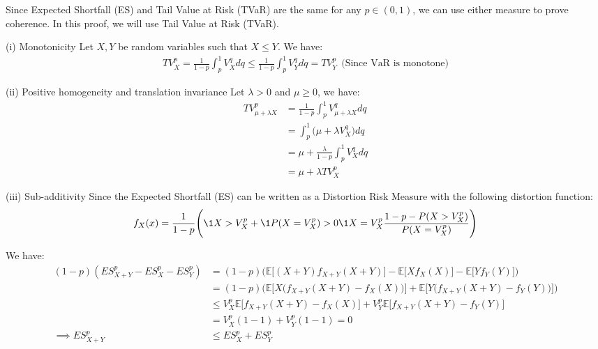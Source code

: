 \begin{proof*}
    Since Expected Shortfall (ES) and Tail Value at Risk (TVaR) are the same for any $p\in(0,1)$, we can use either measure to prove coherence. In this proof, we will use Tail Value at Risk (TVaR).

    \begin{subproof}{\newline (i) Monotonicity}
        Let $X, Y$ be random variables such that $X \le Y$. We have:
        \begin{align*}
            TV_X^p = \frac{1}{1-p}\int_p^1 V_X^qdq \le \frac{1}{1-p}\int_p^1 V_Y^qdq = TV_Y^p \ \ \text{(Since VaR is monotone)}
        \end{align*}
    \end{subproof}
    
    \begin{subproof}{\newline (ii) Positive homogeneity and translation invariance}
        Let $\lambda > 0$ and $\mu \ge 0$, we have:
        \begin{align*}
            TV_{\mu + \lambda X}^p &= \frac{1}{1-p}\int_p^1 V_{\mu + \lambda X}^q dq \\
            &= \int_p^1 \Big( \mu + \lambda V_X^q \Big)dq \\
            &= \mu + \frac{\lambda}{1-p}\int_p^1 V_X^qdq \\
            &= \mu + \lambda TV_X^p
        \end{align*}
    \end{subproof}

    \begin{subproof}{\newline (iii) Sub-additivity}
        Since the Expected Shortfall (ES) can be written as a Distortion Risk Measure with the following distortion function:
        \begin{align*}
            f_X(x) = \frac{1}{1-p}\Bigg( 
                \1{X > V_X^p} + \1{P(X=V_X^p) > 0}\1{X=V_X^p}\frac{1-p-P(X>V_X^p)}{P(X=V_X^p)}
            \Bigg)
        \end{align*}

        \noindent\newline We have:
        \begin{align*}
            (1 - p)(ES_{X+Y}^p - ES_X^p - ES_Y^p) 
                &= (1 - p)\Bigg( \mathbb{E}\Big[ (X+Y)f_{X+Y}(X + Y)\Big] - \mathbb{E}\Big[ Xf_X(X) \Big] - \mathbb{E}\Big[ Yf_Y(Y) \Big] \Bigg) \\
                &= (1 - p)\Bigg( \mathbb{E}\Big[ X\Big(f_{X+Y}(X+Y) - f_X(X)\Big) \Big] + \mathbb{E}\Big[ Y\Big(f_{X+Y}(X+Y) - f_Y(Y)\Big)\Big] \Bigg) \\
                &\le V_X^p \mathbb{E}\Big[ f_{X+Y}(X+Y) - f_X(X)\Big] + V_Y^p \mathbb{E}\Big[ f_{X+Y}(X+Y) - f_Y(Y) \Big] \\
                &= V_X^p(1 - 1) + V_Y^p(1-1) = 0 \\
                \implies ES_{X+Y}^p &\le ES_X^p + ES_Y^p
        \end{align*}
    \end{subproof}
\end{proof*}

